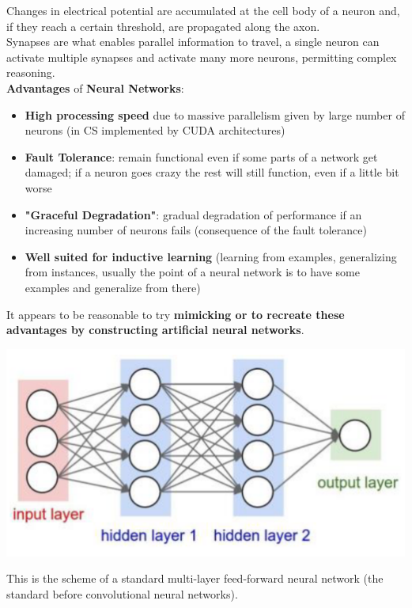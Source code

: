 Changes in electrical potential are accumulated at the cell body of a neuron and, if they reach a certain threshold, are propagated along the axon.\\

Synapses are what enables parallel information to travel, a single neuron can activate multiple synapses and activate many more neurons, permitting complex reasoning.\\

\textbf{Advantages} of \textbf{Neural Networks}:
\begin{itemize}
	\item \textbf{High processing speed} due to massive parallelism given by large number of neurons (in CS implemented by CUDA architectures)
	
	\item \textbf{Fault Tolerance}: remain functional even if some parts of a network get damaged; if a neuron goes crazy the rest will still function, even if a little bit worse
	
	\item \textbf{"Graceful Degradation"}: gradual degradation of performance if an increasing number of neurons fails (consequence of the fault tolerance)
	
	\item \textbf{Well suited for inductive learning} (learning from examples, generalizing from instances, usually the point of a neural network is to have some examples and generalize from there)
\end{itemize}

It appears to be reasonable to try \textbf{mimicking or to recreate these advantages by constructing artificial neural networks}.
\begin{center}
	\includegraphics[width=0.75\columnwidth]{img/NN/NN1}
\end{center}
This is the scheme of a standard multi-layer feed-forward neural network (the standard before convolutional neural networks).\\

